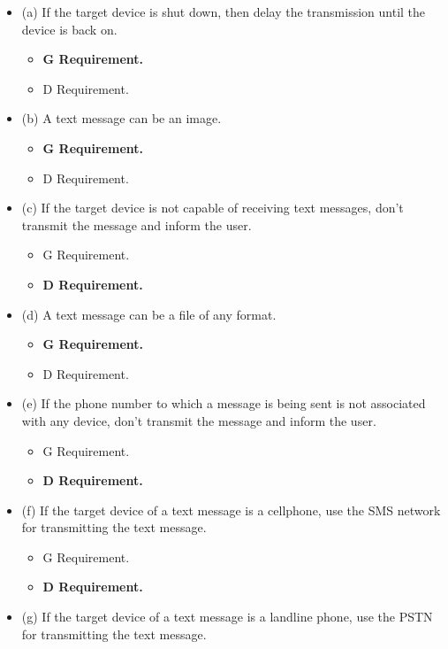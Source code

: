 \documentclass{article}
\begin{document}
\begin{itemize}
    \item (a) If the target device is shut down, then delay the transmission until the device is back on.
    \begin{itemize}
        \item \textbf{G Requirement.} \checkmark
        \item D Requirement.
    \end{itemize}
    \item (b) A text message can be an image.
    \begin{itemize}
        \item \textbf{G Requirement.} \checkmark
        \item D Requirement.
    \end{itemize}
    \item (c) If the target device is not capable of receiving text messages, don't transmit the message and inform the user.
    \begin{itemize}
        \item G Requirement.
        \item \textbf{D Requirement.} \checkmark
    \end{itemize}
    \item (d) A text message can be a file of any format.
    \begin{itemize}
        \item \textbf{G Requirement.} \checkmark
        \item D Requirement.
    \end{itemize}
    \item (e) If the phone number to which a message is being sent is not associated with any device, don't transmit the message and inform the user.
    \begin{itemize}
        \item G Requirement.
        \item \textbf{D Requirement.} \checkmark
    \end{itemize}
    \item (f) If the target device of a text message is a cellphone, use the SMS network for transmitting the text message.
    \begin{itemize}
        \item G Requirement.
        \item \textbf{D Requirement.} \checkmark
    \end{itemize}
    \item (g) If the target device of a text message is a landline phone, use the PSTN for transmitting the text message.

\end{itemize}
\end{document}
